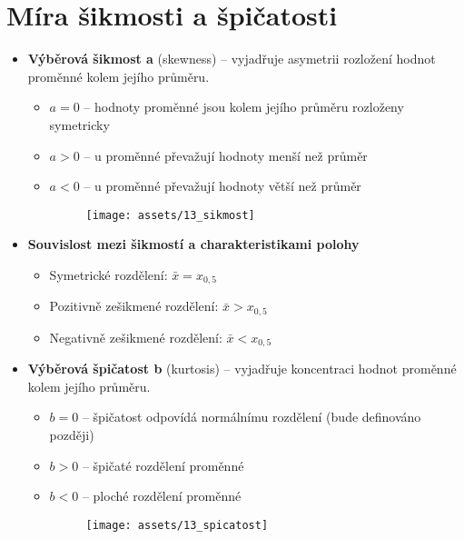\section{Míra šikmosti a špičatosti}
\begin{itemize}
    \item \textbf{Výběrová šikmost a} (skewness) -- vyjadřuje asymetrii rozložení hodnot proměnné kolem jejího průměru.
          \begin{itemize}
              \item $a = 0$ -- hodnoty proměnné jsou kolem jejího průměru rozloženy symetricky
              \item $a > 0$ -- u proměnné převažují hodnoty menší než průměr
              \item $a < 0$ -- u proměnné převažují hodnoty větší než průměr
                    \begin{figure}[H]
                        \centering
                        \texttt{[image: assets/13\_sikmost]}
                    \end{figure}
          \end{itemize}
    \item \textbf{Souvislost mezi šikmostí a charakteristikami polohy}
          \begin{itemize}
              \item Symetrické rozdělení: $\bar{x} = x_{0,5}$
              \item Pozitivně zešikmené rozdělení: $\bar{x} > x_{0,5}$
              \item Negativně zešikmené rozdělení: $\bar{x} < x_{0,5}$
          \end{itemize}
    \item \textbf{Výběrová špičatost b} (kurtosis) -- vyjadřuje koncentraci hodnot proměnné kolem jejího průměru.
          \begin{itemize}
              \item $b = 0$ -- špičatost odpovídá normálnímu rozdělení (bude definováno později)
              \item $b > 0$ -- špičaté rozdělení proměnné
              \item $b < 0$ -- ploché rozdělení proměnné
                    \begin{figure}[H]
                        \centering
                        \texttt{[image: assets/13\_spicatost]}
                    \end{figure}
          \end{itemize}
\end{itemize}


